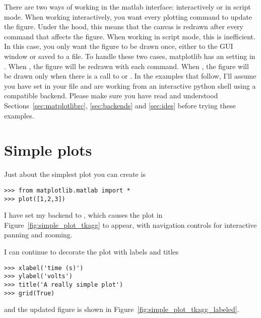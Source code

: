 \documentclass[twoside]{book}
\begin{document}
There are two ways of working in the matlab interface: interactively
or in script mode.  When working interactively, you want every
plotting command to update the figure.  Under the hood, this means
that the canvas is redrawn after every command that affects the
figure.  When working in script mode, this is inefficient.  In this
case, you only want the figure to be drawn once, either to the GUI
window or saved to a file.  To handle these two cases, matplotlib has
an  setting in .  When
, the figure will be redrawn with each command.
When , the figure will be drawn only when
there is a call to  or .  In the examples
that follow, I'll assume you have set  in your
 file and are working from an interactive python
shell using a compatible backend.  Please make sure you have read and
understood Sections~\ref{sec:matplotlibrc}, \ref{sec:backends} and
\ref{sec:ides} before trying these examples.

\section{Simple plots}
\label{sec:simple_plot}

Just about the simplest plot you can create is

\begin{lstlisting}
>>> from matplotlib.matlab import *
>>> plot([1,2,3])
\end{lstlisting}

\noindent I have set my backend to , which causes
the plot in Figure~\ref{fig:simple_plot_tkagg} to appear, with
navigation controls for interactive panning and zooming.


I can continue to decorate the plot with labels and titles

\begin{lstlisting}
>>> xlabel('time (s)')
>>> ylabel('volts')
>>> title('A really simple plot')
>>> grid(True)
\end{lstlisting}

\noindent and the updated figure is shown in Figure~\ref{fig:simple_plot_tkagg_labeled}.
\end{document}
